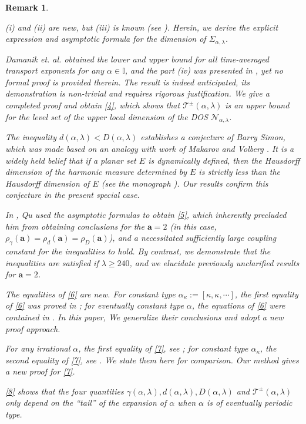\documentclass[reqno,11pt,graphicx,]{amsart}
\numberwithin{equation}{section}
\theoremstyle{plain}
\newcommand{\I}{{\mathbb I}}
\newcommand{\3}{\mathbf{3}}
\newcommand{\ma}{\mathbf{a}}
\newtheorem{remark}[theorem]{Remark}
\begin{document}
\begin{remark}
\begin{enumerate}
{				\item (i) and (ii) are new, but (iii) is known (see \cite[Theorem 1.2]{FLW2011}). Herein, we derive the explicit expression and asymptotic formula for the dimension of $\Sigma_{\alpha,\lambda}$. 
				\item 	Damanik et. al. \cite{DGLQ2015} obtained the lower and upper bound for all time-averaged transport exponents for any $\alpha\in\I$, and the part (iv) was presented in \cite[Proposition 4.8(c) and p. 1433]{DGLQ2015}, yet no formal proof is provided therein. The result is indeed anticipated, its demonstration is non-trivial and requires rigorous justification. We give a completed proof and obtain \eqref{4}, which shows that $\mathcal{T}^{\pm}(\alpha,\lambda)$ is an upper bound for the level set of the upper local dimension of the DOS $\mathcal{N}_{\alpha,\lambda}$.
				\item The inequality $d(\alpha,\lambda)<D(\alpha,\lambda)$ establishes a conjecture of Barry Simon, which was made based on an analogy with work of Makarov and Volberg \cite{Ma1998,Vo1993}. It is a widely held belief that if a planar set $E$ is dynamically defined, then the Hausdorff dimension of the harmonic measure determined by $E$ is strictly less than the Hausdorff dimension of $E$ (see the monograph \cite{GM2005}). Our results confirm this conjecture in the present special case.
				
				\item In \cite{Qu2016}, Qu used the asymptotic formulas to obtain \eqref{5}, which inherently precluded him from obtaining conclusions for the $\ma=2$ (in this case, $\rho_{\gamma}(\ma)=\rho_d(\ma)=\rho_D(\ma)$), and a necessitated sufficiently large coupling constant for the inequalities to hold. By contrast, we demonstrate that the inequalities are satisfied if $\lambda\geq240$, and we elucidate previously unclarified results for $\ma=2$.
				
				\item The equalities of \eqref{6} are new. For constant type $\alpha_{\kappa}:=[\kappa,\kappa,\cdots]$, the first equality of \eqref{6} was proved in \cite{Mu2019}; for eventually constant type $\alpha$, the equations of \eqref{6} were contained in \cite[Theorem 1 (iv)]{Qu2016}. In this paper, We generalize their conclusions and adopt a new proof approach.
				
				\item For any irrational $\alpha$, the first equality of \eqref{7}, see \cite{FLW2011,LQW2014}; for constant type $\alpha_{\kappa}$, the second equality of \eqref{7}, see \cite[Theorem 1.4]{DGLQ2015}.  We state them here for comparison. Our method gives a new proof for \eqref{7}.
				
				\item  \eqref{8} shows that the four quantities $\gamma(\alpha,\lambda), d(\alpha,\lambda), D(\alpha,\lambda) $ and $  \mathcal{T}^{\pm}(\alpha,\lambda)$
				only depend on the “tail” of the expansion of $\alpha$ when $\alpha$ is of eventually periodic type.
			}
		\end{enumerate}
	\end{remark}
\end{document}
